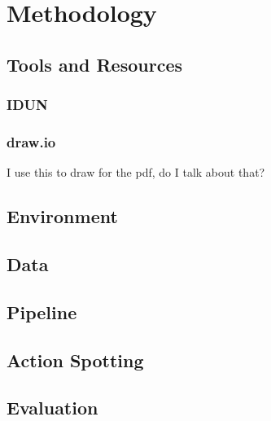 \chapter{Methodology} 
\label{chap:methodology}

\section{Tools and Resources}

\subsection{IDUN}

\subsection{draw.io}
I use this to draw for the pdf, do I talk about that?

\section{Environment}

\section{Data}

\section{Pipeline}

\section{Action Spotting}

\section{Evaluation}

